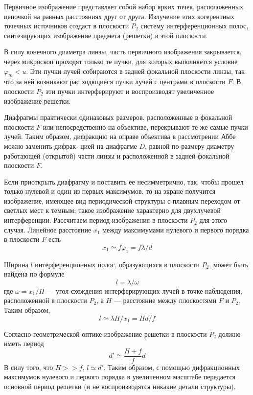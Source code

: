 \documentclass[12pt]{article}
\begin{document}
	Первичное изображение представляет собой набор ярких точек, расположенных цепочкой на равных расстояниях друг от друга. Излучение	этих когерентных точечных источников создаст в плоскости	$P_2$ систему
	интерференционных полос, синтезирующих изображение предмета (решетки) в этой плоскости.
	
	В силу конечного диаметра линзы, часть первичного изображения закрывается, через микроскоп проходят только те пучки, для которых выполняется условие $\varphi_m < u$.
	Эти пучки лучей собираются в задней фокальной плоскости линзы, так что за ней возникают рас
	ходящиеся пучки лучей с центрами в плоскости $F$. В плоскости $P_2$ эти пучки
	интерферируют и воспроизводят увеличенное изображение решетки.
	
	Диафрагмы практически одинаковых размеров, расположенные в фокальной плоскости
	$F$ или непосредственно на объективе, перекрывают те же самые пучки лучей.
	Таким образом, дифракцию на оправе объектива в рассмотрении Аббе можно заменить дифрак-
	цией на диафрагме $D$, равной по размеру диаметру работающей (открытой) части линзы
	и расположенной в задней фокальной плоскости
	$F$.
	
	Если приоткрыть диафрагму и поставить ее несимметрично, так, чтобы прошел только нулевой и один из первых максимумов, то на экране
	получится изображение, имеющее вид периодической структуры с плавным переходом от светлых мест к темным; такое изображение характерно для двухлучевой интерференции.
	Рассчитаем период изображения в
	плоскости $P_2$ для этого случая. Линейное расстояние
	$x_1$ между максимумами нулевого
	и первого порядка в плоскости $F$ есть
	$$x_1 \simeq f\varphi_1 = f\lambda/d$$
	
	Ширина $l$ интерференционных полос, образующихся в плоскости $P_2$, может быть найдена по формуле
	$$ l = \lambda/\omega$$
	где $\omega	= x_1/H$
	— угол схождения интерферирующих лучей в точке наблюдения, расположенной в плоскости
	$P_2$, а $H$
	— расстояние между плоскостями
	$F$ и $P_2$. Таким образом,
	$$l \simeq \lambda H/x_1 = Hd/f$$
	
	Согласно геометрической оптике изображение решетки в плоскости
	$P_2$ должно иметь период
	$$d' \simeq \dfrac{H+f}{f}d$$
	В силу того, что $H >> f$, $l \simeq d'$.
	Таким образом, с помощью дифракционных максимумов нулевого
	и первого порядка в увеличенном масштабе передается основной
	период решетки (и не воспроизводятся никакие детали структуры).
\end{document}
